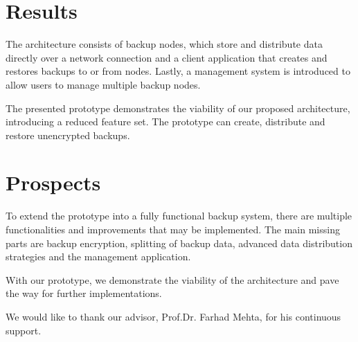 \section*{Results}
The architecture consists of backup nodes, which store and distribute data directly over a network connection and a client application that creates and restores backups to or from nodes. Lastly, a management system is introduced to allow users to manage multiple backup nodes.

The presented prototype demonstrates the viability of our proposed architecture, introducing a reduced feature set. The prototype can create, distribute and restore unencrypted backups.

\section*{Prospects}

To extend the prototype into a fully functional backup system, there are multiple functionalities and improvements that may be implemented. The main missing parts are backup encryption, splitting of backup data, advanced data distribution strategies and the management application.

With our prototype, we demonstrate the viability of the architecture and pave the way for further implementations.



\begin{acknowledgements}
\addchaptertocentry{\acknowledgementname} %
We would like to thank our advisor, Prof.Dr. Farhad Mehta, for his continuous support.

\end{acknowledgements}


\setcounter{tocdepth}{2}
\tableofcontents %


